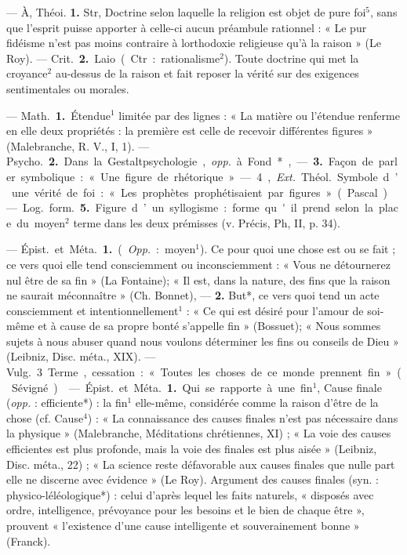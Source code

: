 \begin{itemize}[leftmargin=1cm, label=, itemsep=1pt]
 — À, Théoi. {\bf 1.} Str, Doctrine
selon laquelle la religion est objet
de pure foi$^5$, sans que l'esprit puisse
apporter à celle-ci aucun préambule rationnel : « Le pur fidéisme
n’est pas moins contraire à lorthodoxie religieuse qu'à la raison » (Le
Roy). — \si{Crit.} {\bf 2.} Laio (Ctr. : rationalisme$^2$). Toute doctrine qui met
la croyance$^2$ au-dessus de la raison
et fait reposer la vérité sur des exigences sentimentales ou morales.

 — \si{Math.} {\bf 1.} Étendue$^1$ limitée
par des lignes : « La matière ou
l'étendue renferme en elle deux
propriétés : la première est celle de
recevoir différentes figures » (Malebranche, R. V., I, 1). — \si{Psycho.}
 {\bf 2.} Dans la Gestaltpsychologie, {\it opp.} à
Fond*, — {\bf 3.} Façon de parler symbolique : « Une figure de rhétorique ». — 4, {\it Ext.} \si{Théol.} Symbole
d’une vérité de foi : « Les prophètes
prophétisaient par figures » (Pascal).

— \si{Log.} \si{form.} {\bf 5.} Figure d’un syllogisme : forme qu'il prend selon
la place du moyen$^2$ terme dans
les deux prémisses (v. Précis, Ph, II,
p. 34).

 — \si{Épist.} et \si{Méta.} {\bf 1.} ({\it Opp.} :
moyen$^1$). Ce pour quoi une chose
est ou se fait ; ce vers quoi elle tend
consciemment ou inconsciemment :
« Vous ne détournerez nul être de
sa fin » (La Fontaine); « Il est, dans
la nature, des fins que la raison ne
saurait méconnaître » (Ch. Bonnet),
— {\bf 2.} But*, ce vers quoi tend un
acte consciemment et intentionnellement$^1$ : « Ce qui est désiré pour
l'amour de soi-même et à cause de
sa propre bonté s’appelle fin » (Bossuet); « Nous sommes sujets à nous
abuser quand nous voulons déterminer les fins ou conseils de Dieu »
(Leibniz, Disc. méta., XIX).
— \si{Vulg.} 3 Terme, cessation :
« Toutes les choses de ce monde
prennent fin » (Sévigné).

 — \si{Épist.} et \si{Méta.} {\bf 1.} Qui se
rapporte à une fin$^1$, Cause finale
({\it opp.} : efficiente*) : la fin$^1$ elle-même,
considérée comme la raison d’être
de la chose (cf. Cause$^4$) : « La connaissance des causes finales n’est
pas nécessaire dans la physique »
(Malebranche, Méditations chrétiennes, XI) ; « La voie des causes
efficientes est plus profonde, mais
la voie des finales est plus aisée »
(Leibniz, Disc. méta., 22) ; « La
science reste défavorable aux causes
finales que nulle part elle ne discerne
avec évidence » (Le Roy). Argument des causes finales (syn. : physico-léléologique*) : celui d’après
lequel les faits naturels, « disposés
avec ordre, intelligence, prévoyance
pour les besoins et le bien de chaque
être », prouvent « l'existence d’une
cause intelligente et souverainement bonne » (Franck).


\end{itemize}
